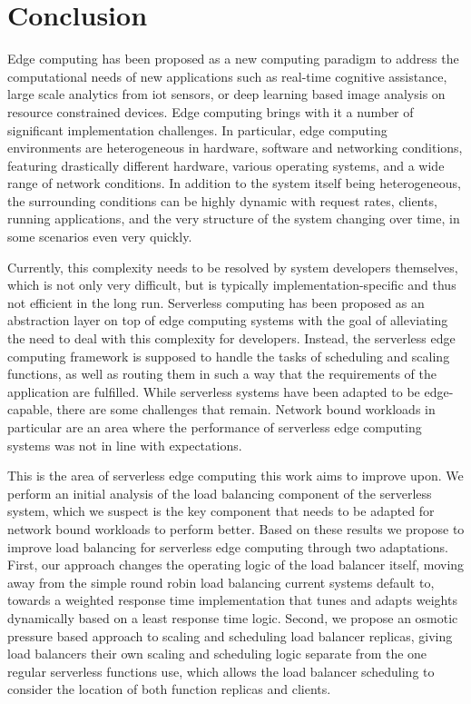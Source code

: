 
\chapter{Conclusion}
Edge computing has been proposed as a new computing paradigm to address the computational needs of new applications such as real-time cognitive assistance, large scale analytics from \gls{iot} sensors, or deep learning based image analysis on resource constrained devices.
Edge computing brings with it a number of significant implementation challenges.
In particular, edge computing environments are heterogeneous in hardware, software and networking conditions, featuring drastically different hardware, various operating systems, and a wide range of network conditions.
In addition to the system itself being heterogeneous, the surrounding conditions can be highly dynamic with request rates, clients, running applications, and the very structure of the system changing over time, in some scenarios even very quickly.

Currently, this complexity needs to be resolved by system developers themselves, which is not only very difficult, but is typically implementation-specific and thus not efficient in the long run.
Serverless computing has been proposed as an abstraction layer on top of edge computing systems with the goal of alleviating the need to deal with this complexity for developers.
Instead, the serverless edge computing framework is supposed to handle the tasks of scheduling and scaling functions, as well as routing them in such a way that the requirements of the application are fulfilled.
While serverless systems have been adapted to be edge-capable, there are some challenges that remain.
Network bound workloads in particular are an area where the performance of serverless edge computing systems was not in line with expectations.

This is the area of serverless edge computing this work aims to improve upon.
We perform an initial analysis of the load balancing component of the serverless system, which we suspect is the key component that needs to be adapted for network bound workloads to perform better.
Based on these results we propose to improve load balancing for serverless edge computing through two adaptations.
First, our approach changes the operating logic of the load balancer itself, moving away from the simple round robin load balancing current systems default to, towards a weighted response time implementation that tunes and adapts weights dynamically based on a least response time logic.
Second, we propose an osmotic pressure based approach to scaling and scheduling load balancer replicas, giving load balancers their own scaling and scheduling logic separate from the one regular serverless functions use, which allows the load balancer scheduling to consider the location of both function replicas and clients.

